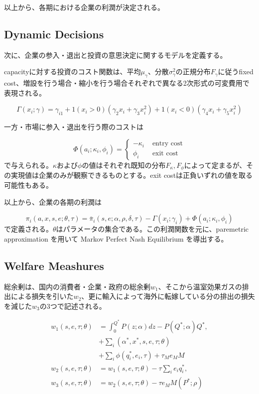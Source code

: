 \documentclass[11pt]{jsarticle}
\begin{document}
以上から、各期における企業の利潤が決定される。

\subsection{Dynamic Decisions}

次に、企業の参入・退出と投資の意思決定に関するモデルを定義する。

capacityに対する投資のコスト関数は、平均$\mu_{\gamma}$、分散$\sigma_{\gamma}^2$の正規分布$F_{\gamma}$に従うfixed cost、増設を行う場合・縮小を行う場合それぞれで異なる2次形式の可変費用で表現される。

\[
\Gamma(x_i;\gamma) = \gamma_{i1} + 1 (x_i > 0)(\gamma_2 x_i + \gamma_3 x_i^2) + 1 (x_i < 0)(\gamma_4 x_i + \gamma_5 x_i^2)
\]

一方・市場に参入・退出を行う際のコストは

\[
\Phi(a_i; \kappa_i, \phi_i) = \begin{cases}
- \kappa_i & \text{ entry cost} \\
\phi_i & \text{ exit cost}
\end{cases}
\]
で与えられる。$\kappa$および$\phi$の値はそれぞれ既知の分布$F_{\kappa}, F_{\phi}$によって定まるが、その実現値は企業のみが観察できるものとする。exit costは正負いずれの値を取る可能性もある。

以上から、企業の各期の利潤は

\[
\pi_i(a, x, s, e; \theta, \tau) = \bar{\pi}_i (s, e; \alpha, \rho, \delta, \tau) - \Gamma (x_i; \gamma_i) + \Phi (a_i; \kappa_i, \phi_i)
\]
で定義される。$\theta$はパラメータの集合である。この利潤関数を元に、paremetric approximation を用いて Markov Perfect Nash Equilibrium を導出する。

\subsection{Welfare Meashures}

総余剰は、国内の消費者・企業・政府の総余剰$w_1$、そこから温室効果ガスの排出による損失を引いた$w_2$、更に輸入によって海外に転嫁している分の排出の損失を減じた$w_3$の3つで記述される。

\begin{align*}
  w_1(s, e, \tau; \theta) &= \int_0^{Q^*} P(z; \alpha)dz - P(Q^*; \alpha)Q^*, \\
  &+ \sum_i (\alpha^*, x^*, s, e, \tau; \theta) \\
  &+ \sum_i \phi(q^*_i, e_i, \tau) + \tau_M e_M M \\
  w_2(s, e, \tau; \theta) & = w_1(s, e, \tau; \theta) - \tau \sum_i e_i q_i^*, \\
  w_3(s, e, \tau; \theta) & = w_2(s, e, \tau; \theta) - \tau e_M M(P^*; \rho)
\end{align*}
\end{document}
